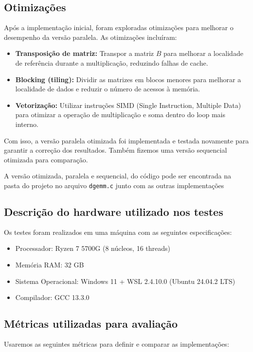 \documentclass[12pt, a4paper]{article}
\begin{document}
	\subsection{Otimizações}

	Após a implementação inicial, foram exploradas otimizações para melhorar o desempenho
	da versão paralela. As otimizações incluíram:
	\begin{itemize}
		\item \textbf{Transposição de matriz:} Transpor a matriz $B$ para melhorar a localidade de referência
		durante a multiplicação, reduzindo falhas de cache.

		\item \textbf{Blocking (tiling):} Dividir as matrizes em blocos menores para melhorar a localidade de dados
		e reduzir o número de acessos à memória.

		\item \textbf{Vetorização:} Utilizar instruções SIMD (Single Instruction, Multiple Data) para otimizar a operação
		de multiplicação e soma dentro do loop mais interno.
	\end{itemize}

	Com isso, a versão paralela otimizada foi implementada e testada novamente para garantir
	a correção dos resultados. Também fizemos uma versão sequencial otimizada para comparação.

	A versão otimizada, paralela e sequencial, do código pode ser encontrada na pasta do projeto no arquivo \texttt{dgemm.c} junto
	com as outras implementações

    \subsection{Descrição do hardware utilizado nos testes}

    Os testes foram realizados em uma máquina com as seguintes especificações:
    \begin{itemize}
        \item Processador: Ryzen 7 5700G (8 núcleos, 16 threads)
        \item Memória RAM: 32 GB
        \item Sistema Operacional: Windows 11 + WSL 2.4.10.0 (Ubuntu 24.04.2 LTS)
        \item Compilador: GCC 13.3.0
    \end{itemize}

	\subsection{Métricas utilizadas para avaliação}
	Usaremos as seguintes métricas para definir e comparar as implementações:
\end{document}
